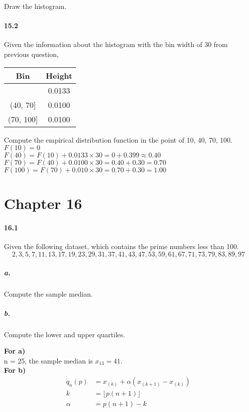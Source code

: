 \documentclass[11pt]{article} %
\begin{document}
Draw the histogram. 

\paragraph*{15.2} Given the information about the histogram with the bin width of 30 from previous question, 
\begin{table}[h!]
\centering
\begin{tabular}{cc} \\ \hline \hline 
Bin & Height \\ \hline 
[10, 40]  & 0.0133 \\
(40, 70] & 0.0100 \\
(70, 100] & 0.0100 \\
\hline \hline
\end{tabular}
\end{table}
Compute the empirical distribution function in the point of 10, 40, 70, 100. \\
$F(10) = 0$\\
$F(40) = F(10) + 0.0133\times 30 = 0 + 0.399 \approx 0.40$ \\
$F(70) = F(40) + 0.0100 \times 30 = 0.40 + 0.30 = 0.70$ \\
$F(100) = F(70) + 0.010 \times 30 = 0.70 + 0.30 = 1.00$

\section{Chapter 16}

\paragraph*{16.1} Given the following dataset, which contains the prime numbers less than 100. 
$$
2, 3, 5, 7, 11, 13, 17, 19, 23, 29, 31, 37, 41, 43, 47, 53, 59, 61, 67, 71, 73, 79, 83, 89, 97
$$
\subparagraph*{a.} Compute the sample median. 
\subparagraph*{b.} Compute the lower and upper quartiles. 

{\bf For a)} \\
n = 25, the sample median is $x_{13} = 41$. \\

{\bf For b)} \\
\begin{align*}
q_n(p) & =  x_{(k)} + \alpha \left( x_{(k+1)} - x_{(k)}\right) \\
k & = \lfloor p(n+1) \rfloor \\
\alpha & = p(n+1) - k
\end{align*}
\end{document}
